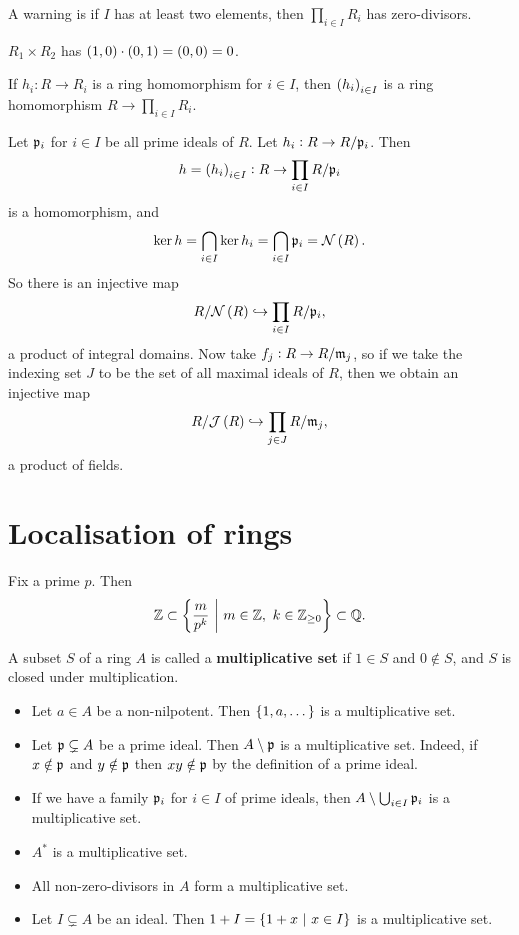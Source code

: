 A warning is if $ I $ has at least two elements, then $ \prod_{i \in I} R_i $ has zero-divisors.

\begin{example*}
$ R_1 \times R_2 $ has $ \br{1, 0} \cdot \br{0, 1} = \br{0, 0} = 0 $.
\end{example*}

If $ h_i : R \to R_i $ is a ring homomorphism for $ i \in I $, then $ \br{h_i}_{i \in I} $ is a ring homomorphism $ R \to \prod_{i \in I} R_i $.

\begin{remark}
Let $ \mathfrak{p}_i $ for $ i \in I $ be all prime ideals of $ R $. Let $ h_i : R \to R / \mathfrak{p}_i $. Then
$$ h = \br{h_i}_{i \in I} : R \to \prod_{i \in I} R / \ppp_i $$
is a homomorphism, and
$$ \ker h = \bigcap_{i \in I} \ker h_i = \bigcap_{i \in I} \ppp_i = \NNN\br{R}. $$
So there is an injective map
$$ R / \NNN\br{R} \hookrightarrow \prod_{i \in I} R / \ppp_i, $$
a product of integral domains. Now take $ f_j : R \to R / \mathfrak{m}_j $, so if we take the indexing set $ J $ to be the set of all maximal ideals of $ R $, then we obtain an injective map
$$ R / \JJJ\br{R} \hookrightarrow \prod_{j \in J} R / \mmm_j, $$
a product of fields.
\end{remark}

\pagebreak

\section{Localisation of rings}

\begin{example*}
Fix a prime $ p $. Then
$$ \ZZ \subset \cbr{\dfrac{m}{p^k} \st m \in \ZZ, \ k \in \ZZ_{\ge 0}} \subset \QQ. $$
\end{example*}

\begin{definition}
A subset $ S $ of a ring $ A $ is called a \textbf{multiplicative set} if $ 1 \in S $ and $ 0 \notin S $, and $ S $ is closed under multiplication.
\end{definition}

\begin{example}
\hfill
\begin{itemize}
\item Let $ a \in A $ be a non-nilpotent. Then $ \cbr{1, a, \dots} $ is a multiplicative set.
\item Let $ \mathfrak{p} \subsetneq A $ be a prime ideal. Then $ A \setminus \mathfrak{p} $ is a multiplicative set. Indeed, if $ x \notin \mathfrak{p} $ and $ y \notin \mathfrak{p} $ then $ xy \notin \mathfrak{p} $ by the definition of a prime ideal.
\item If we have a family $ \mathfrak{p}_i $ for $ i \in I $ of prime ideals, then $ A \setminus \bigcup_{i \in I} \mathfrak{p}_i $ is a multiplicative set.
\item $ A^* $ is a multiplicative set.
\item All non-zero-divisors in $ A $ form a multiplicative set.
\item Let $ I \subsetneq A $ be an ideal. Then $ 1 + I = \cbr{1 + x \st x \in I} $ is a multiplicative set.
\end{itemize}
\end{example}


